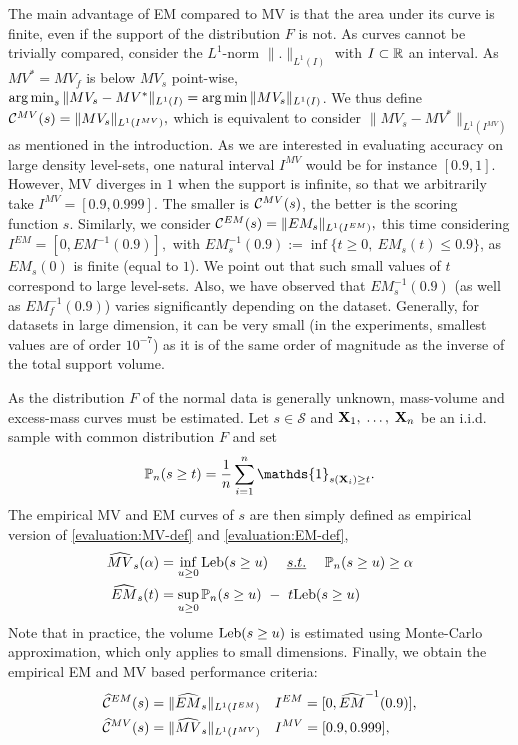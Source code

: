 The main advantage of EM compared to MV is that the area under its curve is finite, even if the support of the distribution $F$ is not.
As curves cannot be trivially compared, consider the $L^1$-norm $\|.\|_{L^1(I)}$ with $I\subset \mathbb{R}$ an interval. As $MV^*=MV_f$ is below $MV_s$ point-wise, $\argmin_s \| MV_s - MV^* \|_{L^1(I)} = \argmin \| MV_s \|_{L^1(I)} $. We thus define
$\mathcal{C}^{MV}(s) = \| MV_s \|_{L^1(I^{MV})},$ which is equivalent to consider $\| MV_s - MV^* \|_{L^1(I^{MV})}$ as mentioned in the introduction. As we are interested in evaluating accuracy on large density level-sets, one natural interval $I^{MV}$ would be for instance $[0.9, 1]$. However, MV diverges in $1$ when the support is infinite, so that we arbitrarily take $I^{MV} = [0.9, 0.999].$
The smaller is $\mathcal{C}^{MV}(s)$, the better is the scoring function $s$.
%
Similarly, we consider $\mathcal{C}^{EM}(s) = \| EM_s \|_{L^1(I^{EM})}, $ this time considering $I^{EM} = [0,EM^{-1}(0.9)],$ with $EM_s^{-1}(0.9) := \inf\{t\ge 0,~ EM_s(t) \le 0.9\}$, as $EM_s(0)$ is finite (equal to $1$). We point out that such small values of $t$ correspond to large level-sets. Also, we have observed that
$EM_s^{-1}(0.9)$ (as well as $EM_f^{-1}(0.9)$) varies significantly depending on the dataset. Generally, for datasets in large dimension, it can be %
very small (in the experiments, smallest values are of order $10^{-7}$) as it is of the same order of magnitude as the inverse of the total support volume.

As the distribution $F$ of the normal data is generally unknown, mass-volume and excess-mass curves must be estimated. Let $s\in \mathcal{S}$ and $\mathbf X_1,\; \ldots,\; \mathbf X_n$ be an i.i.d. sample with common distribution $F$ and set $$\mathbb{P}_n(s \ge t)=\frac{1}{n}\sum_{i=1}^n\mathds{1}_{s(\mb X_i)\geq t}.$$ The empirical MV and EM curves of $s$ are then simply defined as empirical version of \eqref{evaluation:MV-def} and \eqref{evaluation:EM-def}, 
\begin{align}
\label{evaluation:MV-def-emp}
\widehat{MV}_s(\alpha) &= \inf_{u \ge 0} \text{Leb}(s \ge u) ~~~~\emph{s.t.}{}~~~~ \mathbb{P}_n(s \ge u) \ge \alpha\\
\label{evaluation:EM-def-emp}
\widehat{EM}_s(t) &= \sup_{u \ge 0} \mathbb{P}_n(s \ge u) ~-~ t \text{Leb}(s \ge u)
\end{align}
%
Note that in practice, the volume $\text{Leb}(s \ge u)$ is estimated using Monte-Carlo approximation, which only applies to small dimensions.
%
Finally, we obtain the empirical EM and MV based performance criteria:
\begin{align}
\label{evaluation:eq:standard_emp_EM}\widehat{\mathcal{C}}^{EM}(s) &= \| \widehat{EM}_s \|_{L^1(I^{EM})}  &&I^{EM} = [0,\widehat{EM}^{-1}(0.9)],\\
\label{evaluation:eq:standard_emp_MV}\widehat{\mathcal{C}}^{MV}(s) &= \| \widehat{MV}_s \|_{L^1(I^{MV})}  &&I^{MV} = [0.9, 0.999],
\end{align}

